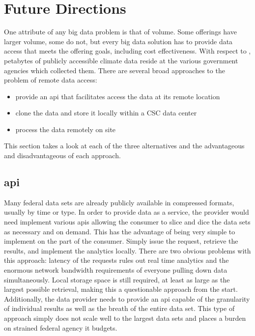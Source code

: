 \section{Future Directions}
One attribute of any big data problem is that of volume. Some offerings have larger volume, some do not, but every big data solution  has to provide data access that meets the offering goals, including cost effectiveness. With respect to \climatedge, petabytes of publicly accessible climate data reside at the various  government agencies which collected them. There are several broad approaches to the problem of remote data access:
\begin{itemize}
    \item provide an \gls{api} that facilitates access the data at its remote location
    \item clone the data and store it locally within a \textsc{CSC} data center
    \item process the data remotely on site
\end{itemize}
This section takes a look at each of the three alternatives and the advantageous and disadvantageous of each approach.
\subsection{\gls{api}}
Many federal data sets are already publicly available in compressed formats, usually by time or type. In order to provide data as a service, the provider would need implement various \gls{api}s allowing the consumer to slice and dice the data sets as necessary and on demand. This has the advantage of being very simple to implement on the part of the consumer. Simply issue the request, retrieve the results, and implement the analytics locally. There are two obvious problems with this approach: latency of the requests rules out real time analytics and the enormous network bandwidth requirements of everyone pulling down data simultaneously. Local storage space is still required, at least as large as the largest possible retrieval, making this a questionable approach from the start. Additionally, the data provider needs to provide an \gls{api} capable of the granularity of individual results as well as the breath of the entire data set. This type of approach simply does not scale well to the largest data sets and places a burden on strained federal agency \gls{it} budgets.
